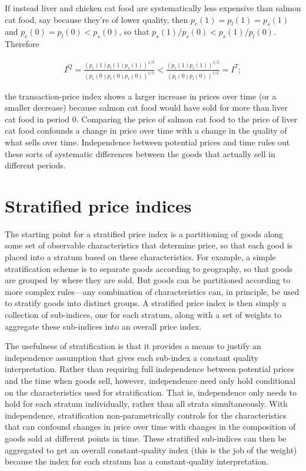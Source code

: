 \documentclass[]{article}
\begin{document}
If instead liver and chicken cat food are systematically less expensive than salmon cat food, say because they're of lower quality, then \(p_{c}(1) = p_{l}(1) = p_{s}(1)\) and \(p_{c}(0) = p_{l}(0) < p_{s}(0)\), so that \(p_{s}(1) / p_{s}(0) < p_{s}(1) / p_{l}(0)\). Therefore

\begin{align*}
I^{Q} = \frac{(p_{c}(1) p_{l}(1) p_{s}(1))^{1 / 3}}{(p_{c}(0) p_{l}(0) p_{s}(0))^{1 / 3}} < \frac{(p_{c}(1) p_{s}(1))^{1 / 2}}{(p_{l}(0) p_{l}(0))^{1 / 2}} = I^{T};
\end{align*}

the transaction-price index shows a larger increase in prices over time (or a smaller decrease) because salmon cat food would have sold for more than liver cat food in period 0. Comparing the price of salmon cat food to the price of liver cat food confounds a change in price over time with a change in the quality of what sells over time. Independence between potential prices and time rules out these sorts of systematic differences between the goods that actually sell in different periods.

\hypertarget{stratified-price-indices}{%
\section{Stratified price indices}\label{stratified-price-indices}}

The starting point for a stratified price index is a partitioning of goods along some set of observable characteristics that determine price, so that each good is placed into a stratum based on these characteristics. For example, a simple stratification scheme is to separate goods according to geography, so that goods are grouped by where they are sold. But goods can be partitioned according to more complex rules---any combination of characteristics can, in principle, be used to stratify goods into distinct groups. A stratified price index is then simply a collection of sub-indices, one for each stratum, along with a set of weights to aggregate these sub-indices into an overall price index.

The usefulness of stratification is that it provides a means to justify an independence assumption that gives each sub-index a constant quality interpretation. Rather than requiring full independence between potential prices and the time when goods sell, however, independence need only hold conditional on the characteristics used for stratification. That is, independence only needs to hold for each stratum individually, rather than all strata simultaneously. With independence, stratification non-parametrically controls for the characteristics that can confound changes in price over time with changes in the composition of goods sold at different points in time. These stratified sub-indices can then be aggregated to get an overall constant-quality index (this is the job of the weight) because the index for each stratum has a constant-quality interpretation.
\end{document}
